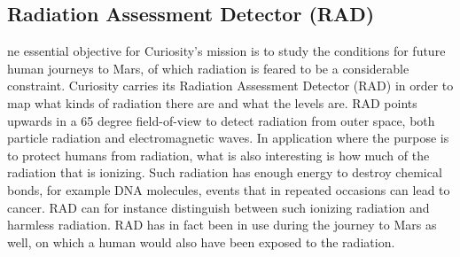 \subsection{Radiation Assessment Detector (RAD)}
ne essential objective for Curiosity's mission is to study the conditions for future human journeys to Mars, of which radiation is feared to be a considerable constraint.
Curiosity carries its Radiation Assessment Detector (RAD) in order to map what kinds of radiation there are and what the levels are.
RAD points upwards in a 65 degree field-of-view to detect radiation from outer space, both particle radiation and electromagnetic waves.
In application where the purpose is to protect humans from radiation, what is also interesting is how much of the radiation that is ionizing.
Such radiation has enough energy to destroy chemical bonds, for example DNA molecules, events that in repeated occasions can lead to cancer.
RAD can for instance distinguish between such ionizing radiation and harmless radiation.
RAD has in fact been in use during the journey to Mars as well, on which a human would also have been exposed to the radiation. \cite{RAD}